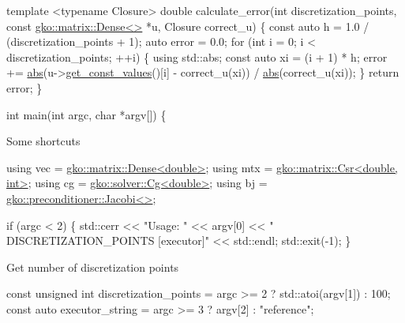 \begin{DoxyCode}
\textcolor{keyword}{template} <\textcolor{keyword}{typename} Closure>
\textcolor{keywordtype}{double} calculate\_error(\textcolor{keywordtype}{int} discretization\_points, \textcolor{keyword}{const} \hyperlink{classgko_1_1matrix_1_1Dense}{gko::matrix::Dense<>} *u,
                       Closure correct\_u)
\{
    \textcolor{keyword}{const} \textcolor{keyword}{auto} h = 1.0 / (discretization\_points + 1);
    \textcolor{keyword}{auto} error = 0.0;
    \textcolor{keywordflow}{for} (\textcolor{keywordtype}{int} i = 0; i < discretization\_points; ++i) \{
        \textcolor{keyword}{using} std::abs;
        \textcolor{keyword}{const} \textcolor{keyword}{auto} xi = (i + 1) * h;
        error +=
            \hyperlink{namespacegko_a57797fc0a00fd4b7ff34ca4bfc84bc51}{abs}(u->\hyperlink{classgko_1_1matrix_1_1Dense_ab83c739c1b11abaecc3bfd89506f6c9c}{get\_const\_values}()[i] - correct\_u(xi)) / 
      \hyperlink{namespacegko_a57797fc0a00fd4b7ff34ca4bfc84bc51}{abs}(correct\_u(xi));
    \}
    \textcolor{keywordflow}{return} error;
\}


\textcolor{keywordtype}{int} main(\textcolor{keywordtype}{int} argc, \textcolor{keywordtype}{char} *argv[])
\{
\end{DoxyCode}


Some shortcuts


\begin{DoxyCode}
\textcolor{keyword}{using} vec = \hyperlink{classgko_1_1matrix_1_1Dense}{gko::matrix::Dense<double>};
\textcolor{keyword}{using} mtx = \hyperlink{classgko_1_1matrix_1_1Csr}{gko::matrix::Csr<double, int>};
\textcolor{keyword}{using} cg = \hyperlink{classgko_1_1solver_1_1Cg}{gko::solver::Cg<double>};
\textcolor{keyword}{using} bj = \hyperlink{classgko_1_1preconditioner_1_1Jacobi}{gko::preconditioner::Jacobi<>};

\textcolor{keywordflow}{if} (argc < 2) \{
    std::cerr << \textcolor{stringliteral}{"Usage: "} << argv[0] << \textcolor{stringliteral}{" DISCRETIZATION\_POINTS [executor]"}
              << std::endl;
    std::exit(-1);
\}
\end{DoxyCode}


Get number of discretization points


\begin{DoxyCode}
\textcolor{keyword}{const} \textcolor{keywordtype}{unsigned} \textcolor{keywordtype}{int} discretization\_points =
    argc >= 2 ? std::atoi(argv[1]) : 100;
\textcolor{keyword}{const} \textcolor{keyword}{auto} executor\_string = argc >= 3 ? argv[2] : \textcolor{stringliteral}{"reference"};
\end{DoxyCode}


